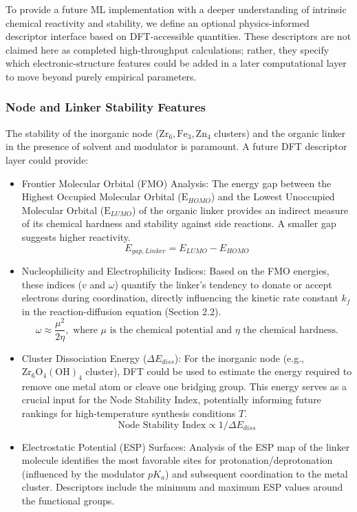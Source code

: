 \documentclass[12pt,a4paper]{article}
\begin{document}
To provide a future ML implementation with a deeper understanding of intrinsic chemical reactivity and stability, we define an optional physics-informed descriptor interface based on DFT-accessible quantities. These descriptors are not claimed here as completed high-throughput calculations; rather, they specify which electronic-structure features could be added in a later computational layer to move beyond purely empirical parameters.

\subsubsection{Node and Linker Stability Features}

The stability of the inorganic node ($\text{Zr}_6, \text{Fe}_3, \text{Zn}_4$ clusters) and the organic linker in the presence of solvent and modulator is paramount. A future DFT descriptor layer could provide:
\begin{itemize}
    \item Frontier Molecular Orbital (FMO) Analysis: The energy gap between the Highest Occupied Molecular Orbital ($\text{E}_{HOMO}$) and the Lowest Unoccupied Molecular Orbital ($\text{E}_{LUMO}$) of the organic linker provides an indirect measure of its chemical hardness and stability against side reactions. A smaller gap suggests higher reactivity.
    \[
    E_{gap, Linker} = E_{LUMO} - E_{HOMO}
    \]
    \item Nucleophilicity and Electrophilicity Indices: Based on the FMO energies, these indices ($v$ and $\omega$) quantify the linker's tendency to donate or accept electrons during coordination, directly influencing the kinetic rate constant $k_f$ in the reaction-diffusion equation (Section 2.2).
    \[
    \omega \approx \frac{\mu^2}{2\eta}, \text{ where } \mu \text{ is the chemical potential and } \eta \text{ the chemical hardness.}
    \]
    \item Cluster Dissociation Energy ($\Delta E_{diss}$): For the inorganic node (e.g., $\text{Zr}_6 \text{O}_4 (\text{OH})_4$ cluster), DFT could be used to estimate the energy required to remove one metal atom or cleave one bridging group. This energy serves as a crucial input for the Node Stability Index, potentially informing future rankings for high-temperature synthesis conditions $T$.
    \[
    \text{Node Stability Index} \propto 1 / \Delta E_{diss}
    \]
    \item Electrostatic Potential (ESP) Surfaces: Analysis of the ESP map of the linker molecule identifies the most favorable sites for protonation/deprotonation (influenced by the modulator $pK_a$) and subsequent coordination to the metal cluster. Descriptors include the minimum and maximum ESP values around the functional groups.
\end{itemize}
\end{document}

